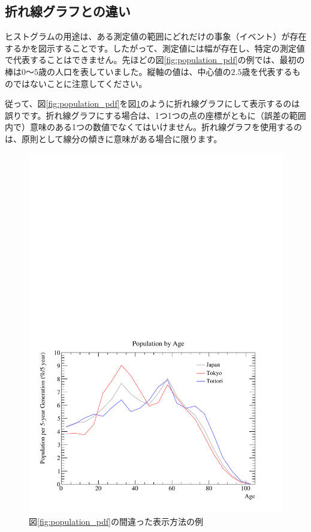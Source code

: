 \subsection{折れ線グラフとの違い}

ヒストグラムの用途は、ある測定値の範囲にどれだけの事象（イベント）が存在するかを図示することです。したがって、測定値には幅が存在し、特定の測定値で代表することはできません。先ほどの図\ref{fig:population_pdf}の例では、最初の棒は$0$〜$5$歳の人口を表していました。縦軸の値は、中心値の$2.5$歳を代表するものではないことに注意してください。

従って、図\ref{fig:population_pdf}を図\ref{fig:population2_pdf}のように折れ線グラフにして表示するのは誤りです。折れ線グラフにする場合は、1つ1つの点の座標がともに（誤差の範囲内で）意味のある1つの数値でなくてはいけません。折れ線グラフを使用するのは、原則として線分の傾きに意味がある場合に限ります。

\begin{figure}
  \centering
  \includegraphics[width=12cm,clip]{fig/population2.pdf}
  \caption{図\ref{fig:population_pdf}の間違った表示方法の例}
  \label{fig:population2_pdf}
\end{figure}

